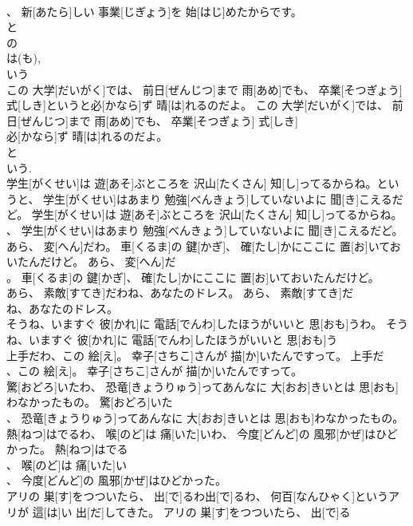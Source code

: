 \documentclass[8pt]{extreport}
\begin{document}
\begin{CJK}{UTF8}{min}
\\	、 新[あたら]しい 事業[じぎょう]を 始[はじ]めたからです。	
\\	と 
\\	の 
\\	は(も), 
\\	いう
\\	この 大学[だいがく]では、 前日[ぜんじつ]まで 雨[あめ]でも、 卒業[そつぎょう] 式[しき]というと必[かなら]ず 晴[は]れるのだよ。	この 大学[だいがく]では、 前日[ぜんじつ]まで 雨[あめ]でも、 卒業[そつぎょう] 式[しき]
\\	必[かなら]ず 晴[は]れるのだよ。	
\\	と 
\\	いう. 
\\	学生[がくせい]は 遊[あそ]ぶところを 沢山[たくさん] 知[し]ってるからね。というと、 学生[がくせい]はあまり 勉強[べんきょう]していないよに 聞[き]こえるだど。	学生[がくせい]は 遊[あそ]ぶところを 沢山[たくさん] 知[し]ってるからね。
\\	、 学生[がくせい]はあまり 勉強[べんきょう]していないよに 聞[き]こえるだど。	
\\	あら、 変[へん]だわ。 車[くるま]の 鍵[かぎ]、 確[たし]かにここに 置[お]いておいたんだけど。	あら、 変[へん]だ
\\	。 車[くるま]の 鍵[かぎ]、 確[たし]かにここに 置[お]いておいたんだけど。	
\\	あら、 素敵[すてき]だわね、あなたのドレス。	あら、 素敵[すてき]だ
\\	ね、あなたのドレス。	
\\	そうね、いますぐ 彼[かれ]に 電話[でんわ]したほうがいいと 思[おも]うわ。	そうね、いますぐ 彼[かれ]に 電話[でんわ]したほうがいいと 思[おも]う
\\	上手だわ、この 絵[え]。 幸子[さちこ]さんが 描[か]いたんですって。	上手だ
\\	、この 絵[え]。 幸子[さちこ]さんが 描[か]いたんですって。	
\\	驚[おどろ]いたわ、 恐竜[きょうりゅう]ってあんなに 大[おお]きいとは 思[おも]わなかったもの。	驚[おどろ]いた
\\	、 恐竜[きょうりゅう]ってあんなに 大[おお]きいとは 思[おも]わなかったもの。	
\\	熱[ねつ]はでるわ、 喉[のど]は 痛[いた]いわ、 今度[どんど]の 風邪[かぜ]はひどかった。	熱[ねつ]はでる
\\	、 喉[のど]は 痛[いた]い
\\	、 今度[どんど]の 風邪[かぜ]はひどかった。	
\\	アリの 巣[す]をつついたら、 出[で]るわ出[で]るわ、 何百[なんひゃく]というアリが 這[は]い 出[だ]してきた。	アリの 巣[す]をつついたら、 出[で]る

\end{CJK}
\end{document}
